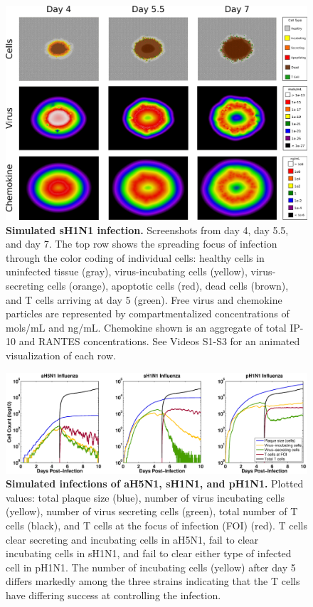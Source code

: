 \documentclass[10pt]{article}
\begin{document}
\begin{figure}[!ht]
\begin{center}
\includegraphics[width=\textwidth]{Figure_5}
 \end{center}
\caption{{\bf Simulated sH1N1 infection.} Screenshots from day 4, day 5.5, and day 7.  The top row shows the spreading focus of infection  through the color coding of individual cells:  healthy cells in uninfected tissue (gray),  virus-incubating cells (yellow), virus-secreting cells (orange), apoptotic cells (red), dead cells (brown), and T cells arriving at day 5 (green).  Free virus and chemokine particles are represented by compartmentalized concentrations of mols/mL and ng/mL.  Chemokine shown is an aggregate of total IP-10 and RANTES concentrations.  See Videos S1-S3 for an animated visualization of each row.} 
 \label{fig:cycells}
\end{figure}


\begin{figure}[!ht]
\begin{center}
\includegraphics[width=\textwidth]{Figure_6}
 \end{center}
\caption{{\bf Simulated infections of aH5N1, sH1N1, and pH1N1.} Plotted values: total plaque size (blue), number of virus incubating cells (yellow), number of virus secreting cells (green), total number of T cells (black), and T cells at the focus of infection (FOI) (red).  T cells clear secreting and incubating cells in aH5N1, fail to clear incubating cells in sH1N1, and fail to clear either type of infected cell in pH1N1.  The number of incubating cells (yellow) after day 5 differs markedly among the three strains indicating that the T cells have differing success at controlling the infection.} 
 \label{fig:plaquesize}
\end{figure}
\end{document}
